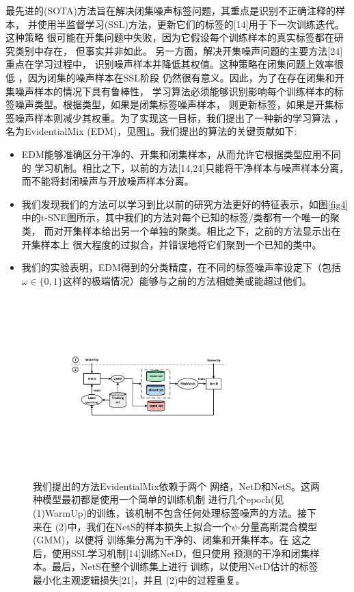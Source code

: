 \documentclass[12pt]{article}
\begin{document}
最先进的(SOTA)方法旨在解决闭集噪声标签问题，其重点是识别不正确注释的样本，
并使用半监督学习(SSL)方法，更新它们的标签的[14]用于下一次训练迭代。这种策略
很可能在开集问题中失败，因为它假设每个训练样本的真实标签都在研究类别中存在，
但事实并非如此。 另一方面，解决开集噪声问题的主要方法[24]重点在学习过程中，
识别噪声样本并降低其权值。这种策略在闭集问题上效率很低 ，因为闭集的噪声样本在SSL阶段
仍然很有意义。因此，为了在存在闭集和开集噪声样本的情况下具有鲁棒性，
学习算法必须能够识别影响每个训练样本的标签噪声类型。根据类型，如果是闭集标签噪声样本，
则更新标签，如果是开集标签噪声样本则减少其权重。为了实现这一目标，我们提出了一种新的学习算法 ，
名为EvidentialMix (EDM)，见图\ref{fig2}。我们提出的算法的关键贡献如下:
\begin{itemize}
    \item EDM能够准确区分干净的、开集和闭集样本，从而允许它根据类型应用不同的
    学习机制。相比之下，以前的方法[14,24]只能将干净样本与噪声样本分离，
    而不能将封闭噪声与开放噪声样本分离。
    \item 我们发现我们的方法可以学习到比以前的研究方法更好的特征表示，如图\ref{fig4}
    中的t-SNE图所示，其中我们的方法对每个已知的标签/类都有一个唯一的聚类，
    而对开集样本给出另一个单独的聚类。相比之下，之前的方法显示出在开集样本上
    很大程度的过拟合，并错误地将它们聚到一个已知的类中。
    \item  我们的实验表明，EDM得到的分类精度，在不同的标签噪声率设定下（包括
    $\omega \in \{0,1\}$这样的极端情况）能够与之前的方法相媲美或能超过他们。
\end{itemize}
\begin{figure}[!htb]
    \centering
    \includegraphics[width=0.8\textwidth]{images/diagrams/EDM_diagram_color6.pdf}
    \caption{我们提出的方法EvidentialMix依赖于两个
    网络，NetD和NetS。这两种模型最初都是使用一个简单的训练机制
    进行几个epoch(见(1)WarmUp)的训练，该机制不包含任何处理标签噪声的方法。接下来在
    (2)中，我们在NetS的样本损失上拟合一个$\psi$-分量高斯混合模型(GMM)，以便将
    训练集分离为干净的、闭集和开集样本。在
    这之后，使用SSL学习机制[14]训练NetD，但只使用
    预测的干净和闭集样本。最后，NetS在整个训练集上进行
    训练，以使用NetD估计的标签最小化主观逻辑损失[21]，并且
    (2)中的过程重复。}
    \label{fig2}
\end{figure}
\end{document}
